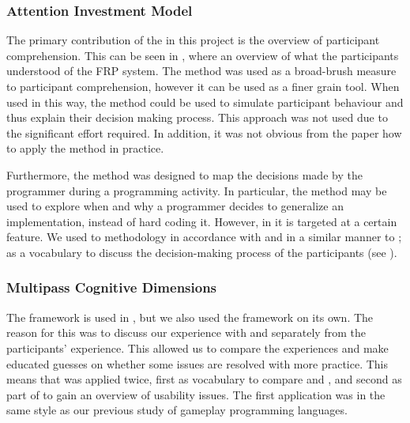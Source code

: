 \subsubsection{Attention Investment Model}
The primary contribution of the \attention in this project is the overview of participant comprehension. This can be seen in , where an overview of what the participants understood of the \gls{FRP} system. The method was used as a broad-brush measure to participant comprehension, however it can be used as a finer grain tool. When used in this way, the method could be used to simulate participant behaviour and thus explain their decision making process\cite{blackwell2002first}. This approach was not used due to the significant effort required. In addition, it was not obvious from the paper how to apply the method in practice.

Furthermore, the \attention method was designed to map the decisions made by the programmer during a programming activity. In particular, the method may be used to explore when and why a programmer decides to generalize an implementation, instead of hard coding it. However, in \champagne it is targeted at a certain feature. We used to methodology in accordance with \champagne and in a similar manner to \cognitive; as a vocabulary to discuss the decision-making  process of the participants (see ).

\subsubsection{Multipass Cognitive Dimensions}
The \cognitive framework is used in \champagne, but we also used the framework on its own. The reason for this was to discuss our experience with \fs and \cs separately from the participants' experience. This allowed us to compare the experiences and make educated guesses on whether some issues are resolved with more practice. This means that \cognitive was applied twice, first as vocabulary to compare \cs and \fs, and second as part of \champagne to gain an overview of usability issues. The first application was in the same style as our previous study of gameplay programming languages\cite{p92018gameplay}.

